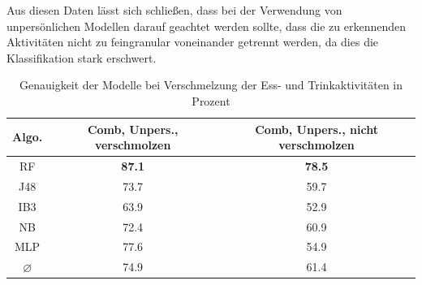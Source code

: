 Aus diesen Daten lässt sich schließen, dass bei der Verwendung von unpersönlichen Modellen darauf geachtet werden sollte, dass die zu erkennenden Aktivitäten nicht zu feingranular voneinander getrennt werden, da dies die Klassifikation stark erschwert.

\begin{table}[h]
	\centering
	\begin{tabular}{|c|c|c|}
		\hline 
		\textbf{Algo.} & \textbf{Comb, Unpers., verschmolzen} & \textbf{Comb, Unpers., nicht verschmolzen} \\ 
		\hline 
		\acs{RF} & \textbf{87.1} &  \textbf{78.5} \\ 
		\acs{J48} & 73.7 &  59.7 \\ 
		\acs{IB}3 & 63.9 &  52.9  \\ 
		\acs{NB} & 72.4 & 60.9  \\ 
		\acs{MLP} & 77.6  & 54.9 \\ 
		\hline 
		$\varnothing$ & 74.9 & 61.4  \\ 
		\hline
	\end{tabular} 
	\caption{Genauigkeit der Modelle bei Verschmelzung der Ess- und Trinkaktivitäten in Prozent}
	\label{tab:accuracy-merge-eating}
\end{table}

